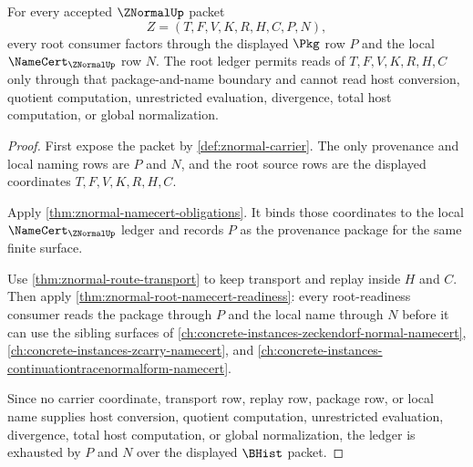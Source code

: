 \begin{theorem}
\label{thm:znormal-root-ledger-exhaustion}
For every accepted $\ZNormalUp$ packet
$$
Z=(T,F,V,K,R,H,C,P,N),
$$
every root consumer factors through the displayed $\Pkg$ row $P$ and the local $\NameCert_{\ZNormalUp}$ row $N$. The root ledger permits reads of $T,F,V,K,R,H,C$ only through that package-and-name boundary and cannot read host conversion, quotient computation, unrestricted evaluation, divergence, total host computation, or global normalization.
\end{theorem}
\begin{proof}
First expose the packet by \autoref{def:znormal-carrier}. The only provenance and local naming rows are $P$ and $N$, and the root source rows are the displayed coordinates $T,F,V,K,R,H,C$.

Apply \autoref{thm:znormal-namecert-obligations}. It binds those coordinates to the local $\NameCert_{\ZNormalUp}$ ledger and records $P$ as the provenance package for the same finite surface.

Use \autoref{thm:znormal-route-transport} to keep transport and replay inside $H$ and $C$. Then apply \autoref{thm:znormal-root-namecert-readiness}: every root-readiness consumer reads the package through $P$ and the local name through $N$ before it can use the sibling surfaces of \autoref{ch:concrete-instances-zeckendorf-normal-namecert}, \autoref{ch:concrete-instances-zcarry-namecert}, and \autoref{ch:concrete-instances-continuationtracenormalform-namecert}.

Since no carrier coordinate, transport row, replay row, package row, or local name supplies host conversion, quotient computation, unrestricted evaluation, divergence, total host computation, or global normalization, the ledger is exhausted by $P$ and $N$ over the displayed $\BHist$ packet.
\end{proof}
